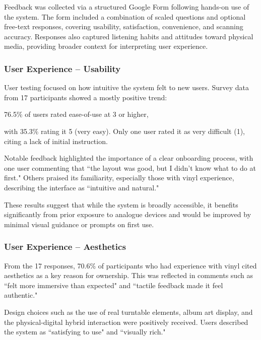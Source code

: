             Feedback was collected via a structured Google Form following hands-on use of the system. The form included a combination of scaled questions and optional free-text responses, covering usability, satisfaction, convenience, and scanning accuracy. Responses also captured listening habits and attitudes toward physical media, providing broader context for interpreting user experience.
        
            \subsubsection{User Experience -- Usability}
                User testing focused on how intuitive the system felt to new users. Survey data from 17 participants showed a mostly positive trend:
                
                    76.5\% of users rated ease-of-use at 3 or higher,
                
                    with 35.3\% rating it 5 (very easy).
                    Only one user rated it as very difficult (1), citing a lack of initial instruction.
                
                Notable feedback highlighted the importance of a clear onboarding process, with one user commenting that ``the layout was good, but I didn't know what to do at first." Others praised its familiarity, especially those with vinyl experience, describing the interface as ``intuitive and natural."
                
                These results suggest that while the system is broadly accessible, it benefits significantly from prior exposure to analogue devices and would be improved by minimal visual guidance or prompts on first use.
    
            \subsubsection{User Experience -- Aesthetics}
                From the 17 responses, 70.6\% of participants who had experience with vinyl cited aesthetics as a key reason for ownership. This was reflected in comments such as ``felt more immersive than expected" and ``tactile feedback made it feel authentic."
    
                Design choices such as the use of real turntable elements, album art display, and the physical-digital hybrid interaction were positively received. Users described the system as ``satisfying to use" and ``visually rich."
                
